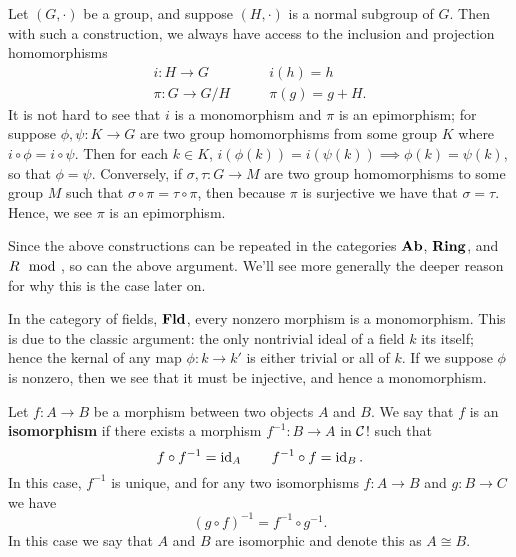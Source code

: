     \begin{example}
        Let $(G, \cdot)$ be a group, and suppose $(H, \cdot)$ is a normal subgroup of 
        $G$. Then with such a construction, we always have access to the 
        inclusion and projection homomorphisms
        \begin{align*}
            i: H \to G \qquad &i(h) = h \\
            \pi: G \to G/H \qquad &\pi(g) = g + H.
        \end{align*}
        It is not hard to see that $i$ is a monomorphism and $\pi$ is an epimorphism; 
        for suppose $\phi, \psi:K \to G$ are two group homomorphisms from some group $K$ 
        where $i \circ \phi = i \circ \psi$. Then for each $k \in K$, $i(\phi(k)) = i(\psi(k))
        \implies \phi(k) = \psi(k)$, so that $\phi = \psi$. Conversely, if $\sigma, \tau: G \to M$ 
        are two group homomorphisms to some group $M$ such that 
        $\sigma \circ \pi = \tau \circ \pi$, then because $\pi$ is surjective we have that 
        $\sigma = \tau$. Hence, we see $\pi$ is an epimorphism.

        Since the above constructions can be repeated in the 
        categories $\operatorname{\mathbf{Ab}}$, $\operatorname{\mathbf{Ring}}$, 
        and $R\mod$, so can the above argument. We'll see more generally 
        the deeper reason for why this is the case later on.
    \end{example}


    \begin{example}
        In the category of fields, $\operatorname{\mathbf{Fld}}$, every nonzero morphism is a 
        monomorphism. This is due to the classic argument: the only nontrivial ideal 
        of a field $k$ its itself; hence the kernal of any map $\phi: k \to k'$ 
        is either trivial or all of $k$. If we suppose $\phi$ is nonzero, then we see 
        that it must be injective, and hence a monomorphism. 
    \end{example}

    \begin{definition}
        Let $f: A \to B$ be a morphism between two objects $A$ and $B$.
        We say that $f$ is an \textbf{isomorphism} if there exists a
        morphism $f^{-1}:B \to A$ in $\mathcal{C}$! such that 
        \[
            f \circ f^{-1} =\operatorname{\mathrm{id}}_A \quad \quad f^{-1} \circ f = \operatorname{\mathrm{id}}_B.
        \]
        In this case, $f^{-1}$ is unique, and for any two isomorphisms
        $f:A \to B$ and  $g:B \to C$ we have
        \[
            (g \circ f)^{-1} = f^{-1}\circ g^{-1}.
        \]
        In this case we say that $A$ and $B$ are isomorphic and denote 
        this as $A \cong B$. 
    \end{definition}

